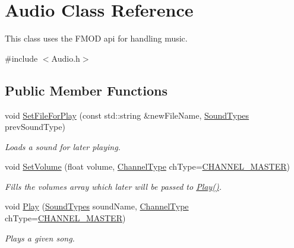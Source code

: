 \hypertarget{class_audio}{\section{Audio Class Reference}
\label{class_audio}
}


This class uses the F\-M\-O\-D api for handling music.  




{\ttfamily \#include $<$Audio.\-h$>$}

\subsection*{Public Member Functions}
\begin{DoxyCompactItemize}
\item 
\hypertarget{class_audio_aba0fe660aeb3893dcd7c9ef7e8f6dd32}{void \hyperlink{class_audio_aba0fe660aeb3893dcd7c9ef7e8f6dd32}{Set\-File\-For\-Play} (const std\-::string \&new\-File\-Name, \hyperlink{_audio_8h_ad6c201b2d4894f8a7b43d7a07bbac991}{Sound\-Types} prev\-Sound\-Type)}\label{class_audio_aba0fe660aeb3893dcd7c9ef7e8f6dd32}

\begin{DoxyCompactList}\small\item\em Loads a sound for later playing. \end{DoxyCompactList}\item 
\hypertarget{class_audio_a470dc02aeba89291a1e69b8ae26bdcdb}{void \hyperlink{class_audio_a470dc02aeba89291a1e69b8ae26bdcdb}{Set\-Volume} (float volume, \hyperlink{_audio_8h_a19a96edeeb9d37072c4ce9f862d19ba8}{Channel\-Type} ch\-Type=\hyperlink{_audio_8h_a19a96edeeb9d37072c4ce9f862d19ba8ae4cbb1538772654fb86ecd9a78681cc7}{C\-H\-A\-N\-N\-E\-L\-\_\-\-M\-A\-S\-T\-E\-R})}\label{class_audio_a470dc02aeba89291a1e69b8ae26bdcdb}

\begin{DoxyCompactList}\small\item\em Fills the {\ttfamily volumes} array which later will be passed to \hyperlink{class_audio_ae8ad050c9de9ccbf547915afa018d59e}{Play()}. \end{DoxyCompactList}\item 
\hypertarget{class_audio_ae8ad050c9de9ccbf547915afa018d59e}{void \hyperlink{class_audio_ae8ad050c9de9ccbf547915afa018d59e}{Play} (\hyperlink{_audio_8h_ad6c201b2d4894f8a7b43d7a07bbac991}{Sound\-Types} sound\-Name, \hyperlink{_audio_8h_a19a96edeeb9d37072c4ce9f862d19ba8}{Channel\-Type} ch\-Type=\hyperlink{_audio_8h_a19a96edeeb9d37072c4ce9f862d19ba8ae4cbb1538772654fb86ecd9a78681cc7}{C\-H\-A\-N\-N\-E\-L\-\_\-\-M\-A\-S\-T\-E\-R})}\label{class_audio_ae8ad050c9de9ccbf547915afa018d59e}

\begin{DoxyCompactList}\small\item\em Plays a given song. \end{DoxyCompactList}\end{DoxyCompactItemize}
